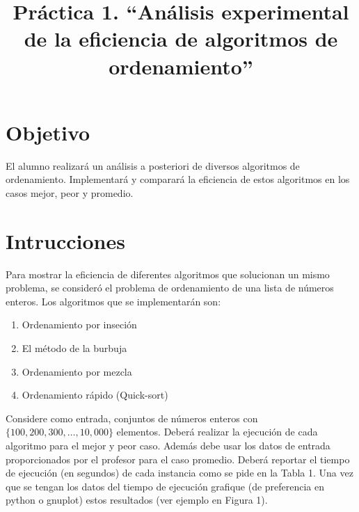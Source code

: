 \documentclass[conference]{IEEEtran}
\begin{document}
%
\title{Pr\'actica 1. ``An\'alisis experimental de la eficiencia de algoritmos de ordenamiento''}


\author{

}
\maketitle



\section{Objetivo}
El alumno realizar\'a un an\'alisis a posteriori de diversos algoritmos de ordenamiento. Implementar\'a y comparar\'a la eficiencia de estos algoritmos en los casos mejor, peor y promedio.

\section{Intrucciones}

Para mostrar la eficiencia de diferentes algoritmos que solucionan un mismo problema, se consider\'o el problema de ordenamiento de una lista de n\'umeros enteros. Los algoritmos que se implementar\'an son:

\begin{enumerate}
	\item Ordenamiento por inseci\'on
	\item El m\'etodo de la burbuja 
	\item Ordenamiento por mezcla
	\item Ordenamiento r\'apido (Quick-sort)
\end{enumerate}

Considere como entrada, conjuntos de n\'umeros enteros con $\{100, 200, 300, \ldots, 10,000\}$ elementos.
Deber\'a realizar la ejecuci\'on de cada algoritmo para el mejor y peor caso. Adem\'as debe usar los datos de entrada proporcionados por el profesor para el caso promedio.
Deber\'a reportar el tiempo de ejecuci\'on (en segundos) de cada instancia  como se pide en la Tabla 1.
Una vez que se tengan los datos del tiempo de ejecuci\'on grafique (de preferencia en python o gnuplot) estos resultados (ver ejemplo en Figura 1).
\end{document}
